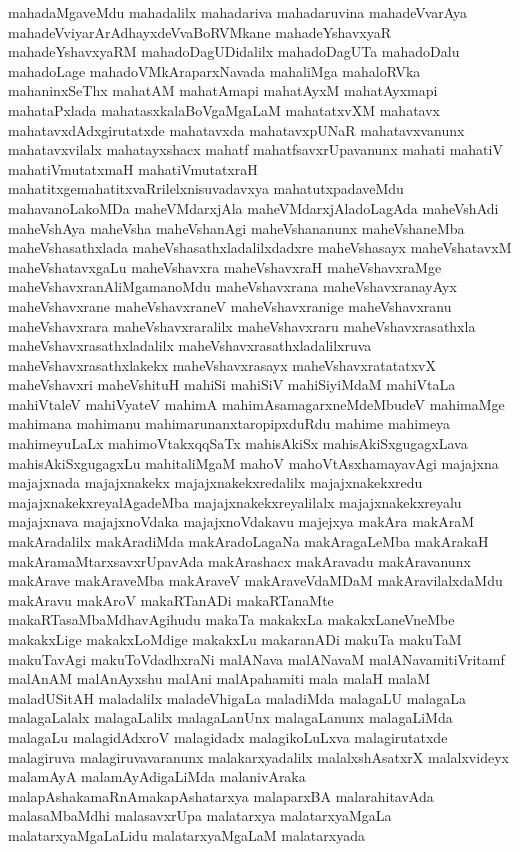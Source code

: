 {mahadaMgaveMdu
mahadalilx
mahadariva
mahadaruvina
mahadeVvarAya
mahadeVviyarArAdhayxdeVvaBoRVMkane
mahadeYshavxyaR
mahadeYshavxyaRM
mahadoDagUDidalilx
mahadoDagUTa
mahadoDalu
mahadoLage
mahadoVMkAraparxNavada
mahaliMga
mahaloRVka
mahaninxSeThx
mahatAM
mahatAmapi
mahatAyxM
mahatAyxmapi
mahataPxlada
mahatasxkalaBoVgaMgaLaM
mahatatxvXM
mahatavx
mahatavxdAdxgirutatxde
mahatavxda
mahatavxpUNaR
mahatavxvanunx
mahatavxvilalx
mahatayxshacx
mahatf
mahatfsavxrUpavanunx
mahati
mahatiV
mahatiVmutatxmaH
mahatiVmutatxraH
mahatitxgemahatitxvaRrilelxnisuvadavxya
mahatutxpadaveMdu
mahavanoLakoMDa
maheVMdarxjAla
maheVMdarxjAladoLagAda
maheVshAdi
maheVshAya
maheVsha
maheVshanAgi
maheVshananunx
maheVshaneMba
maheVshasathxlada
maheVshasathxladalilxdadxre
maheVshasayx
maheVshatavxM
maheVshatavxgaLu
maheVshavxra
maheVshavxraH
maheVshavxraMge
maheVshavxranAliMgamanoMdu
maheVshavxrana
maheVshavxranayAyx
maheVshavxrane
maheVshavxraneV
maheVshavxranige
maheVshavxranu
maheVshavxrara
maheVshavxraralilx
maheVshavxraru
maheVshavxrasathxla
maheVshavxrasathxladalilx
maheVshavxrasathxladalilxruva
maheVshavxrasathxlakekx
maheVshavxrasayx
maheVshavxratatatxvX
maheVshavxri
maheVshituH
mahiSi
mahiSiV
mahiSiyiMdaM
mahiVtaLa
mahiVtaleV
mahiVyateV
mahimA
mahimAsamagarxneMdeMbudeV
mahimaMge
mahimana
mahimanu
mahimarunanxtaropipxduRdu
mahime
mahimeya
mahimeyuLaLx
mahimoVtakxqqSaTx
mahisAkiSx
mahisAkiSxgugagxLava
mahisAkiSxgugagxLu
mahitaliMgaM
mahoV
mahoVtAsxhamayavAgi
majajxna
majajxnada
majajxnakekx
majajxnakekxredalilx
majajxnakekxredu
majajxnakekxreyalAgadeMba
majajxnakekxreyalilalx
majajxnakekxreyalu
majajxnava
majajxnoVdaka
majajxnoVdakavu
majejxya
makAra
makAraM
makAradalilx
makAradiMda
makAradoLagaNa
makAragaLeMba
makArakaH
makAramaMtarxsavxrUpavAda
makArashacx
makAravadu
makAravanunx
makArave
makAraveMba
makAraveV
makAraveVdaMDaM
makAravilalxdaMdu
makAravu
makAroV
makaRTanADi
makaRTanaMte
makaRTasaMbaMdhavAgihudu
makaTa
makakxLa
makakxLaneVneMbe
makakxLige
makakxLoMdige
makakxLu
makaranADi
makuTa
makuTaM
makuTavAgi
makuToVdadhxraNi
malANava
malANavaM
malANavamitiVritamf
malAnAM
malAnAyxshu
malAni
malApahamiti
mala
malaH
malaM
maladUSitAH
maladalilx
maladeVhigaLa
maladiMda
malagaLU
malagaLa
malagaLalalx
malagaLalilx
malagaLanUnx
malagaLanunx
malagaLiMda
malagaLu
malagidAdxroV
malagidadx
malagikoLuLxva
malagirutatxde
malagiruva
malagiruvavaranunx
malakarxyadalilx
malalxshAsatxrX
malalxvideyx
malamAyA
malamAyAdigaLiMda
malanivAraka
malapAshakamaRnAmakapAshatarxya
malaparxBA
malarahitavAda
malasaMbaMdhi
malasavxrUpa
malatarxya
malatarxyaMgaLa
malatarxyaMgaLaLidu
malatarxyaMgaLaM
malatarxyada
}
